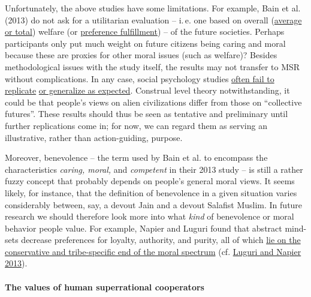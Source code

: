 Unfortunately, the above studies have some limitations. For example,
Bain et al. (2013) do not ask for a utilitarian evaluation -- i.\,e. one
based on overall
(\href{https://en.wikipedia.org/wiki/Average_and_total_utilitarianism}{average
or total}) welfare (or
\href{https://en.wikipedia.org/wiki/Preference_utilitarianism}{preference
fulfillment}) -- of the future societies. Perhaps participants only put
much weight on future citizens being caring and moral because these are
proxies for other moral issues (such as welfare)? Besides methodological
issues with the study itself, the results may not transfer to MSR
without complications. In any case, social psychology studies
\href{https://en.wikipedia.org/wiki/Replication_crisis}{often fail
to replicate}
\href{http://www.openphilanthropy.org/2017-report-consciousness-and-moral-patienthood\#AppendixZ8}{or
generalize as expected}. Construal level theory notwithstanding, it
could be that people's views on alien civilizations differ from those on
``collective futures''. These results should thus be seen as tentative
and preliminary until further replications come in; for now, we can
regard them as serving an illustrative, rather than action-guiding,
purpose.

Moreover, benevolence -- the term used by Bain et al. to encompass the
characteristics \emph{caring, moral,} and \emph{competent} in their 2013
study -- is still a rather fuzzy concept that probably depends on
people's general moral views. It seems likely, for instance, that the
definition of benevolence in a given situation varies considerably
between, say, a devout Jain and a devout Salafist Muslim. In future
research we should therefore look more into what \emph{kind} of
benevolence or moral behavior people value. For example,
Napier and Luguri found that abstract mind-sets
decrease preferences for loyalty, authority, and purity, all of which
\href{https://en.wikipedia.org/wiki/Moral_foundations_theory\#Political_ideology}{lie on the conservative
and tribe-specific end of the moral spectrum} (cf.
\href{https://www.researchgate.net/profile/Jaime_Napier/publication/277451893_Of_two_minds_The_interactive_effect_of_construal_level_and_identity_on_political_polarization/links/56d7f5ec08aebe4638af2566.pdf}{Luguri
and Napier 2013}).

\paragraph{The values of human superrational
cooperators}\label{the-values-of-human-superrational-cooperators}

